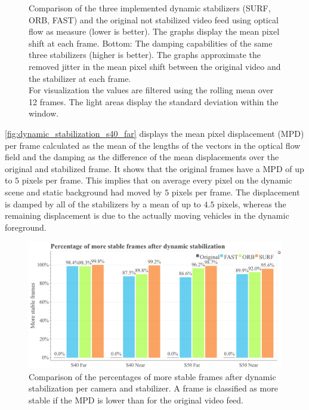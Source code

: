 \begin{figure}[t]
{        Comparison of the three implemented dynamic stabilizers (SURF, ORB, FAST) and the original not stabilized video feed using optical flow as measure (lower is better).
        The graphs display the mean pixel shift at each frame. 
        Bottom: 
        The damping capabilities of the same three stabilizers (higher is better). 
        The graphs approximate the removed jitter in the mean pixel shift between the original video and the stabilizer at each frame.\\
        For visualization the values are filtered using the rolling mean over 12 frames. 
        The light areas display the standard deviation within the window.
    }
    \label{fig:dynamic_stabilization_s40_far}
\end{figure}

\autoref{fig:dynamic_stabilization_s40_far} displays the mean pixel displacement (MPD) per frame calculated as the mean of the lengths of the vectors in the optical flow field and the damping as the difference of the mean displacements over the original and stabilized frame.
It shows that the original frames have a MPD of up to $5$ pixels per frame. This implies that on average every pixel on the dynamic scene and static background had moved by $5$ pixels per frame. 
The displacement is damped by all of the stabilizers by a mean of up to $4.5$ pixels, whereas the remaining displacement is due to the actually moving vehicles in the dynamic foreground.   

\begin{figure}[!ht]
      \includegraphics[width=\linewidth]{diagrams/optical_flow/stats.html.png}    
    \caption{
        Comparison of the percentages of more stable frames after dynamic stabilization per camera and stabilizer.
        A frame is classified as more stable if the MPD is lower than for the original video feed. 
    }
    \label{fig:dynamic_stabilization}
\end{figure}

